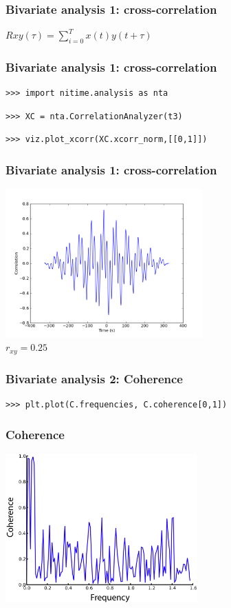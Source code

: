 \documentclass{beamer}
\begin{document}
\begin{frame}
\frametitle{Bivariate analysis 1: cross-correlation}
$Rxy(\tau) = \sum_{i=0}^{T}{x(t)y(t+\tau)}$
\end{frame}

\begin{frame}[fragile]
\frametitle{Bivariate analysis 1: cross-correlation}
\pause
\begin{lstlisting}
>>> import nitime.analysis as nta
\end{lstlisting}

\pause
\begin{lstlisting}
>>> XC = nta.CorrelationAnalyzer(t3) 
\end{lstlisting}

\pause
\begin{lstlisting}
>>> viz.plot_xcorr(XC.xcorr_norm,[[0,1]])
\end{lstlisting}
\end{frame}

\begin{frame}
\frametitle{Bivariate analysis 1: cross-correlation}
\includegraphics[height=5.7cm]{figures/outa_phase_xcorr}
\pause 
\\
$r_{xy}=0.25$
\end{frame}

\begin{frame}[fragile]
\frametitle{Bivariate analysis 2: Coherence}
\begin{lstlisting}
>>> plt.plot(C.frequencies, C.coherence[0,1])
\end{lstlisting}
\end{frame}

\begin{frame}
\frametitle{Coherence}
\includegraphics[height=5.7cm]{figures/outa_phase_tseries_coh}
\end{frame}
\end{document}
